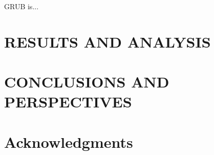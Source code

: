 \documentclass[twoside,a4paper,12pt,english]{inac17}
\begin{document}
GRUB is...


\section{RESULTS AND ANALYSIS}



\section{CONCLUSIONS AND PERSPECTIVES}







\section*{Acknowledgments}

\end{document}

